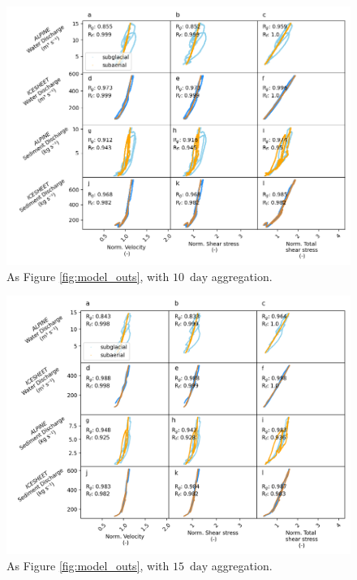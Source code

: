 \documentclass[11pt]{article}
\newcommand{\unit}[1]{$\mathrm{#1}$}
\begin{document}
\begin{center}
  \begin{figure}[h]
    \includegraphics[width=0.7\linewidth]{Fig3_10day.png}
    \caption{As Figure \ref{fig:model_outs}, with $10$ \,\unit{day} aggregation.}
    \label{fig:model_outs_10day}
  \end{figure}
\end{center}
\begin{center}
  \begin{figure}[h]
    \includegraphics[width=0.7\linewidth]{Fig3_15day.png}
    \caption{As Figure \ref{fig:model_outs}, with $15$ \,\unit{day} aggregation.}
    \label{fig:model_outs_15day}
  \end{figure}
\end{center}
\end{document}
